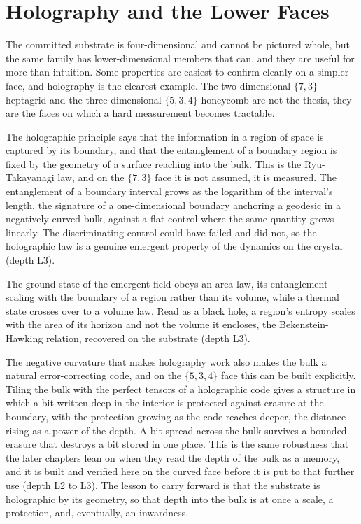 \section{Holography and the Lower Faces}

The committed substrate is four-dimensional and cannot be pictured whole, but the same family has lower-dimensional members that can, and they are useful for more than intuition. Some properties are easiest to confirm cleanly on a simpler face, and holography is the clearest example. The two-dimensional $\{7,3\}$ heptagrid and the three-dimensional $\{5,3,4\}$ honeycomb are not the thesis, they are the faces on which a hard measurement becomes tractable.

The holographic principle says that the information in a region of space is captured by its boundary, and that the entanglement of a boundary region is fixed by the geometry of a surface reaching into the bulk. This is the Ryu-Takayanagi law, and on the $\{7,3\}$ face it is not assumed, it is measured. The entanglement of a boundary interval grows as the logarithm of the interval's length, the signature of a one-dimensional boundary anchoring a geodesic in a negatively curved bulk, against a flat control where the same quantity grows linearly. The discriminating control could have failed and did not, so the holographic law is a genuine emergent property of the dynamics on the crystal (depth L3).

\begin{result}
The ground state of the emergent field obeys an area law, its entanglement scaling with the boundary of a region rather than its volume, while a thermal state crosses over to a volume law. Read as a black hole, a region's entropy scales with the area of its horizon and not the volume it encloses, the Bekenstein-Hawking relation, recovered on the substrate (depth L3).
\end{result}

The negative curvature that makes holography work also makes the bulk a natural error-correcting code, and on the $\{5,3,4\}$ face this can be built explicitly. Tiling the bulk with the perfect tensors of a holographic code gives a structure in which a bit written deep in the interior is protected against erasure at the boundary, with the protection growing as the code reaches deeper, the distance rising as a power of the depth. A bit spread across the bulk survives a bounded erasure that destroys a bit stored in one place. This is the same robustness that the later chapters lean on when they read the depth of the bulk as a memory, and it is built and verified here on the curved face before it is put to that further use (depth L2 to L3). The lesson to carry forward is that the substrate is holographic by its geometry, so that depth into the bulk is at once a scale, a protection, and, eventually, an inwardness.
